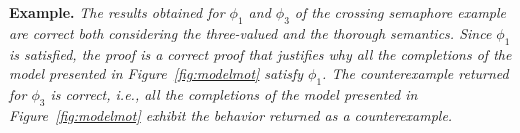 %
% 
%
\textbf{Example.}
\emph{The results obtained for $\phi_1$ and $\phi_3$ of the crossing semaphore example are correct both considering the three-valued and the thorough semantics. 
Since $\phi_1$ is satisfied, the proof is a correct proof that justifies why all the completions of the model presented in Figure~\ref{fig:modelmot} satisfy $\phi_1$.
The counterexample  returned for $\phi_3$ is correct, i.e., all the completions of the model presented in Figure~\ref{fig:modelmot} exhibit the behavior returned as a counterexample.}


